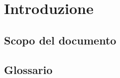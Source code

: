 \documentclass[../ClipsManualeUtente.tex]{subfiles}
\begin{document}
\section{Introduzione}
	\subsection{Scopo del documento}

	\subsection{Glossario}


			
\end{document}
